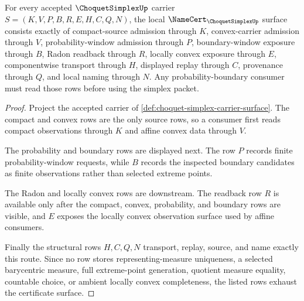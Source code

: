 \begin{theorem}
\label{thm:choquet-simplex-certificate-surface}
For every accepted $\ChoquetSimplexUp$ carrier $S=(K,V,P,B,R,E,H,C,Q,N)$, the local $\NameCert_{\ChoquetSimplexUp}$ surface consists exactly of compact-source admission through $K$, convex-carrier admission through $V$, probability-window admission through $P$, boundary-window exposure through $B$, Radon readback through $R$, locally convex exposure through $E$, componentwise transport through $H$, displayed replay through $C$, provenance through $Q$, and local naming through $N$. Any probability-boundary consumer must read those rows before using the simplex packet.
\end{theorem}
\begin{proof}
Project the accepted carrier of \autoref{def:choquet-simplex-carrier-surface}. The compact and convex rows are the only source rows, so a consumer first reads compact observations through $K$ and affine convex data through $V$.

The probability and boundary rows are displayed next. The row $P$ records finite probability-window requests, while $B$ records the inspected boundary candidates as finite observations rather than selected extreme points.

The Radon and locally convex rows are downstream. The readback row $R$ is available only after the compact, convex, probability, and boundary rows are visible, and $E$ exposes the locally convex observation surface used by affine consumers.

Finally the structural rows $H,C,Q,N$ transport, replay, source, and name exactly this route. Since no row stores representing-measure uniqueness, a selected barycentric measure, full extreme-point generation, quotient measure equality, countable choice, or ambient locally convex completeness, the listed rows exhaust the certificate surface.
\end{proof}



